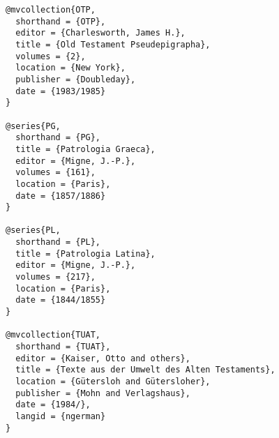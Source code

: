 \documentclass[a4paper]{article}
\begin{document}
\begin{verbatim}
@mvcollection{OTP,
  shorthand = {OTP},
  editor = {Charlesworth, James H.},
  title = {Old Testament Pseudepigrapha},
  volumes = {2},
  location = {New York},
  publisher = {Doubleday},
  date = {1983/1985}
}

@series{PG,
  shorthand = {PG},
  title = {Patrologia Graeca},
  editor = {Migne, J.-P.},
  volumes = {161},
  location = {Paris},
  date = {1857/1886}
}

@series{PL,
  shorthand = {PL},
  title = {Patrologia Latina},
  editor = {Migne, J.-P.},
  volumes = {217},
  location = {Paris},
  date = {1844/1855}
}

@mvcollection{TUAT,
  shorthand = {TUAT},
  editor = {Kaiser, Otto and others},
  title = {Texte aus der Umwelt des Alten Testaments},
  location = {Gütersloh and Gütersloher},
  publisher = {Mohn and Verlagshaus},
  date = {1984/},
  langid = {ngerman}
}
\end{verbatim}

\begin{verbcite}
  \nocite{ANET, ANF:firsted, APOT, DSSSE, COS, MOTP, NHL, NHScr, NPNF:firsted,
    OTP, PG, PL, TUAT}
\end{verbcite}
\exampleabbreviations
{}
\end{document}
